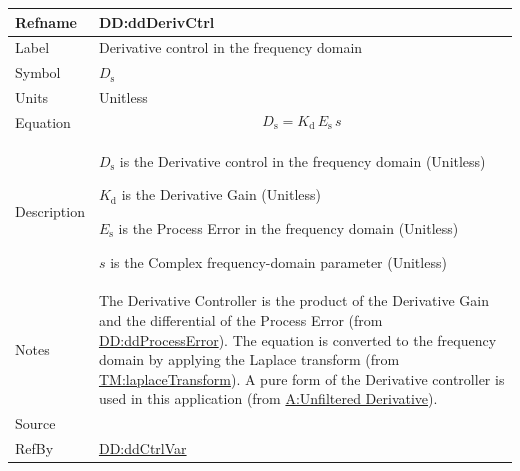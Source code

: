 \documentclass[12pt]{article}
\begin{document}
\medskip
\noindent
\begin{minipage}{\textwidth}
\begin{tabular}{>{\raggedright}p{}>{\raggedright\arraybackslash}p{}}
\toprule \textbf{Refname} & \textbf{DD:ddDerivCtrl}
\label{DD:ddDerivCtrl}
\\ \midrule
Label & Derivative control in the frequency domain
        
\\ \midrule
Symbol & ${D_{\text{s}}}$
         
\\ \midrule
Units & Unitless
        
\\ \midrule
Equation & \begin{displaymath}
           {D_{\text{s}}}={K_{\text{d}}}\,{E_{\text{s}}}\,s
           \end{displaymath}
\\ \midrule
Description & \begin{symbDescription}
              \item{${D_{\text{s}}}$ is the Derivative control in the frequency domain (Unitless)}
              \item{${K_{\text{d}}}$ is the Derivative Gain (Unitless)}
              \item{${E_{\text{s}}}$ is the Process Error in the frequency domain (Unitless)}
              \item{$s$ is the Complex frequency-domain parameter (Unitless)}
              \end{symbDescription}
\\ \midrule
Notes & The Derivative Controller is the product of the Derivative Gain and the differential of the Process Error (from \hyperref[DD:ddProcessError]{DD:ddProcessError}). The equation is converted to the frequency domain by applying the Laplace transform (from \hyperref[TM:laplaceTransform]{TM:laplaceTransform}). A pure form of the Derivative controller is used in this application (from \hyperref[unfilteredDerivative]{A:Unfiltered Derivative}).
        
\\ \midrule
Source & \cite{johnson2008}
         
\\ \midrule
RefBy & \hyperref[DD:ddCtrlVar]{DD:ddCtrlVar}
        
\\ \bottomrule
\end{tabular}
\end{minipage}
\end{document}
